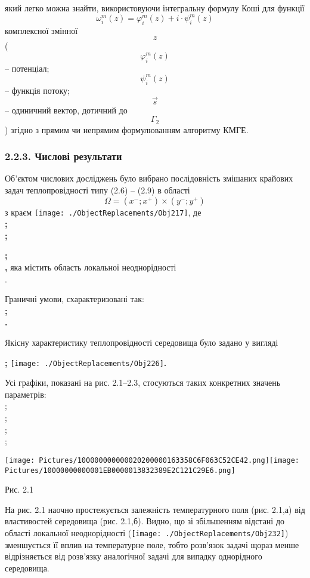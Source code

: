 який легко можна знайти, використовуючи інтегральну формулу Коші для
функції
\[{\omega_{i}^{m}{\left( z \right) = \varphi_{i}^{m}}{\left( z \right) + {i \cdot \psi_{i}^{m}}}\left( z \right)}{}\]
комплексної змінної \[z{}\]( \[{\varphi_{i}^{m}\left( z \right)}{}\] --
потенціал; \[{\psi_{i}^{m}\left( z \right)}{}\] -- функція потоку;
\[\overrightarrow{s}{}\] -- одиничний вектор, дотичний до
\[\Gamma_{2}{}\] ) згідно з прямим чи непрямим формулюванням алгоритму
КМГЕ.

\hypertarget{ux447ux438ux441ux43bux43eux432ux456-ux440ux435ux437ux443ux43bux44cux442ux430ux442ux438}{%
\subsubsection[2.2.3. Числові
результати]{\texorpdfstring{\protect\hypertarget{anchor-34}{}{}2.2.3.
Числові
результати}{2.2.3. Числові результати}}\label{ux447ux438ux441ux43bux43eux432ux456-ux440ux435ux437ux443ux43bux44cux442ux430ux442ux438}}

Об'єктом числових досліджень було вибрано послідовність змішаних
крайових задач теплопровідності типу (2.6) -- (2.9) в області
\[{\Omega = {\left( {x^{-};x^{+}} \right) \times \left( {y^{-};y^{+}} \right)}}{}\]
з краєм
\texttt{[image: ./ObjectReplacements/Obj217]},
де\[\]\textbf{; }\[\]\textbf{;}

\[\]\textbf{; }\[\]\textbf{ , }яка містить область локальної
неоднорідності \[\].

Граничні умови, схарактеризовані так: \[\]\textbf{; }\[\]\textbf{.}

Якісну характеристику теплопровідності середовища було задано у вигляді

\[\]\textbf{;
}\texttt{[image: ./ObjectReplacements/Obj226]}\textbf{.}

Усі графіки, показані на рис. 2.1--2.3, стосуються таких конкретних
значень параметрів: \[\]; \[\]; \[\]; \[\]; \[\]

\texttt{[image: Pictures/100000000000020200000163358C6F063C52CE42.png]}\texttt{[image: Pictures/10000000000001EB0000013832389E2C121C29E6.png]}

Рис. 2.1

На рис. 2.1 наочно простежується залежність температурного поля (рис.
2.1,а) від властивостей середовища (рис. 2.1,б). Видно, що зі
збільшенням відстані до області локальної неоднорідності
(\texttt{[image: ./ObjectReplacements/Obj232]})
зменшується її вплив на температурне поле, тобто розв'язок задачі щораз
менше відрізняється від розв'язку аналогічної задачі для випадку
однорідного середовища.

